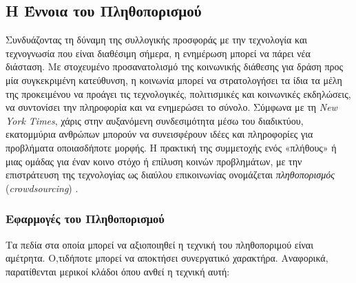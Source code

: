 \subsection{Η Έννοια του Πληθοπορισμού}
Συνδυάζοντας τη δύναμη της συλλογικής προσφοράς με την τεχνολογία και τεχνογνωσία που είναι διαθέσιμη σήμερα, η ενημέρωση μπορεί να πάρει νέα διάσταση. Με στοχευμένο προσανατολισμό της κοινωνικής διάθεσης για δράση προς μία συγκεκριμένη κατεύθυνση, η κοινωνία μπορεί να στρατολογήσει τα ίδια τα μέλη της προκειμένου να προάγει τις τεχνολογικές, πολιτισμικές και κοινωνικές εκδηλώσεις, να συντονίσει την πληροφορία και να ενημερώσει το σύνολο. Σύμφωνα με τη \textit{New York Times}, χάρις στην αυξανόμενη συνδεσιμότητα μέσω του διαδικτύου, εκατομμύρια ανθρώπων μπορούν να συνεισφέρουν ιδέες και πληροφορίες για προβλήματα οποιασδήποτε μορφής. Η πρακτική της συμμετοχής ενός «πλήθους» ή μιας ομάδας για έναν κοινο στόχο ή επίλυση κοινών προβλημάτων, με την επιστράτευση της τεχνολογίας ως διαύλου επικοινωνίας ονομάζεται \textit{πληθοπορισμός} (\textit{crowdsourcing}) \cite{[CSW+18]}.

\subsubsection{Εφαρμογές του Πληθοπορισμού}
Τα πεδία στα οποία μπορεί να αξιοποιηθεί η τεχνική του πληθοποριμού είναι αμέτρητα. Ο,τιδήποτε μπορεί να αποκτήσει συνεργατικό χαρακτήρα. Αναφορικά, παρατίθενται μερικοί κλάδοι όπου ανθεί η τεχνική αυτή:
\begin{description}[font=$\bullet$~\normalfont\color{black}]
\item [Εκπαίδευση]
\item [Οικονομία]
\item [Επιστήμη και Υγεία]
\item [ΙΤ]
\item [Διαφήμιση]
\item [Επιχειρηματικότητα]
\item [Κοινωνικές Εκδηλώσεις και \selectlanguage{english}\textit{NGO}\selectlanguage{greek}]
\end{description}

